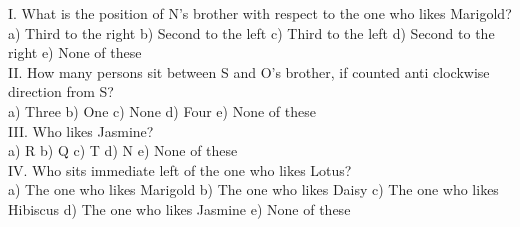 \documentclass[
]{article}
\begin{document}
I. What is the position of N’s brother with respect to the one who likes Marigold?\\
a) Third to the right \hspace{2mm}b) Second to the left \hspace{2mm}c) Third to the left
\hspace{2mm}d) Second to the right \hspace{2mm}e) None of these\\

II. How many persons sit between S and O’s brother, if counted anti clockwise direction
from S?\\
a) Three \hspace{2mm}b) One \hspace{2mm}c) None \hspace{2mm}d) Four \hspace{2mm}e) None of these\\

III. Who likes Jasmine?\\
a) R \hspace{2mm}b) Q \hspace{2mm}c) T \hspace{2mm}d) N \hspace{2mm}e) None of these\\

IV. Who sits immediate left of the one who likes Lotus?\\
a) The one who likes Marigold \hspace{2mm}b) The one who likes Daisy
c) The one who likes Hibiscus \hspace{2mm}d) The one who likes Jasmine
e) None of these\\
\end{document}
